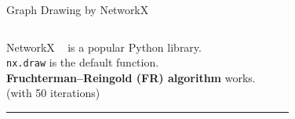\documentclass[dvipdfmx,13pt,aspectratio=169]{beamer}
\newcommand{\red}[1]{\textcolor{red}{#1}}
\newif\ifShowHidden
\begin{document}
\ifShowHidden
  \begin{frame}{Graph Drawing by NetworkX}
    \begin{columns}
      \begin{column}{0.62\columnwidth}
        \large{%
          NetworkX ~\cite{hagberg2008exploring} is a popular Python library.\\
          \texttt{nx.draw} is the default function.\\
          \large{\textbf{Fruchterman--Reingold (FR) algorithm}} works.\\
          (with 50 iterations)
        }
        \begin{center}
          \rule{0.8\columnwidth}{0.4pt}
        \end{center}
        \Large{
          \\
          \\
          \uncover<3->{$\abs{V}=500$: \red{11.5} sec / \red{WHAT IS THIS???}}
        }
      \end{column}
      \begin{column}{0.38\columnwidth}
        \begin{figure}[htbp]
          \centering

\end{figure}
\end{column}
\end{columns}
\end{frame}
\end{document}
